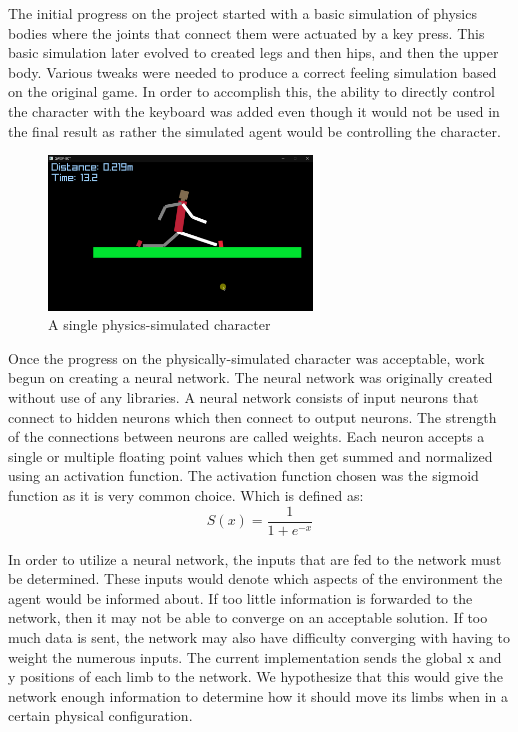 \documentclass[letterpaper]{article} %
\begin{document}
\par The initial progress on the project started with a basic simulation of physics bodies where the joints that connect them were actuated by a key press. This basic simulation later evolved to created legs and then hips, and then the upper body. Various tweaks were needed to produce a correct feeling simulation based on the original game. In order to accomplish this, the ability to directly control the character with the keyboard was added even though it would not be used in the final result as rather the simulated agent would be controlling the character. 

\begin{figure}[h]
\caption{A single physics-simulated character}
\centering
\includegraphics[width=7cm]{character.png}
\end{figure}

\par Once the progress on the physically-simulated character was acceptable, work begun on creating a neural network. The neural network was originally created without use of any libraries. A neural network consists of input neurons that connect to hidden neurons which then connect to output neurons. The strength of the connections between neurons are called weights. Each neuron accepts a single or multiple floating point values which then get summed and normalized using an activation function. The activation function chosen was the sigmoid function as it is very common choice. Which is defined as:
$$
S(x)=\frac{1}{1+e^{-x}}
$$
\par In order to utilize a neural network, the inputs that are fed to the network must be determined. These inputs would denote which aspects of the environment the agent would be informed about. If too little information is forwarded to the network, then it may not be able to converge on an acceptable solution. If too much data is sent, the network may also have difficulty converging with having to weight the numerous inputs. The current implementation sends the global x and y positions of each limb to the network. We hypothesize that this would give the network enough information to determine how it should move its limbs when in a certain physical configuration.
\end{document}
